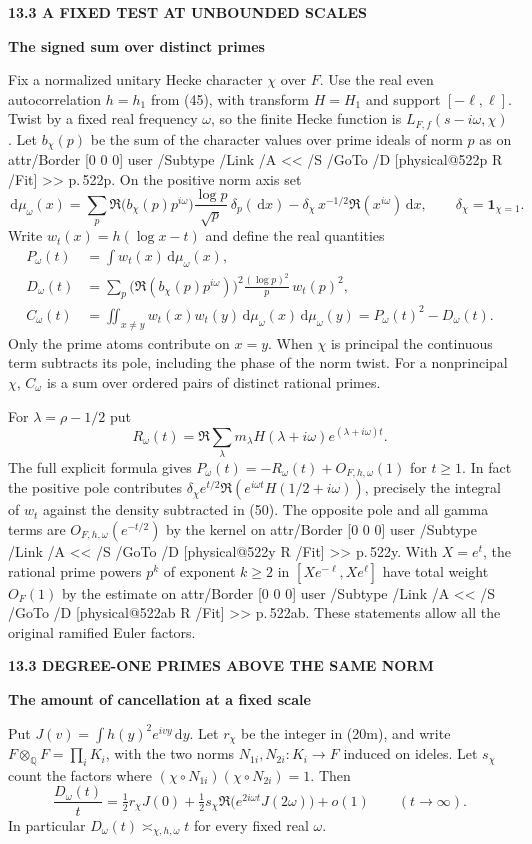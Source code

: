 \documentclass[11pt,letterpaper]{article}
\makeatletter
\newcommand{\rightmarktext}{}
\newcommand{\printfolio}{}
\newcommand{\leaf}[4]{\clearpage\gdef\printfolio{#1}\gdef\rightmarktext{#2}%
  {\small\sffamily\bfseries\color{ink}#3\par}\vspace{3pt}%
  {\LARGE\bfseries #4\par}\vspace{5pt}}
\newcommand{\Q}{\mathbb Q}
\newcommand{\dd}{\,\mathrm d}
\newcommand{\MusicPDFPageRef}[1]{\pdfpageref\csname physical@#1\endcsname\space\space 0 R}
\newcommand{\pagelink}[2]{\leavevmode\pdfstartlink attr{/Border [0 0 0]} user{%
  /Subtype /Link /A << /S /GoTo /D [\MusicPDFPageRef{#1} /Fit] >>}%
  {\color{ink}#2}\pdfendlink}
\newcommand{\pg}[1]{\pagelink{#1}{p.\,#1}}
\makeatother
\begin{document}
\leaf{522ad}{Distinct prime pairs}{13.3 \quad A FIXED TEST AT UNBOUNDED SCALES}{The signed sum over distinct primes}
Fix a normalized unitary Hecke character $\chi$ over $F$. Use the
real even autocorrelation $h=h_1$ from (45), with transform $H=H_1$
and support $[-\ell,\ell]$. Twist by a fixed real frequency $\omega$,
so the finite Hecke function is $L_{F,f}(s-i\omega,\chi)$.
Let $b_\chi(p)$ be the sum of the character values over prime ideals
of norm $p$ as on \pg{522p}. On the positive norm axis set
\[
 \dd\mu_\omega(x)=
 \sum_p\Re\!\big(b_\chi(p)p^{i\omega}\big)\frac{\log p}{\sqrt p}
             \,\delta_p(\dd x)
 -\delta_\chi\,x^{-1/2}\Re(x^{i\omega})\dd x ,
 \qquad \delta_\chi=\mathbf1_{\chi=1}.
\]
Write $w_t(x)=h(\log x-t)$ and define the real quantities
\begin{align*}
 P_\omega(t)&=\int w_t(x)\dd\mu_\omega(x),\\
 D_\omega(t)&=\sum_p\big(\Re(b_\chi(p)p^{i\omega})\big)^2
                      \frac{(\log p)^2}{p}\,w_t(p)^2,\\
 C_\omega(t)&=\iint_{x\ne y}w_t(x)w_t(y)\dd\mu_\omega(x)\dd\mu_\omega(y)
                   =P_\omega(t)^2-D_\omega(t).
 \tag{50}
\end{align*}
Only the prime atoms contribute on $x=y$. When $\chi$ is principal
the continuous term subtracts its pole, including the phase of the
norm twist. For a nonprincipal $\chi$, $C_\omega$ is a sum over
ordered pairs of distinct rational primes.

For $\lambda=\rho-1/2$ put
\[
 R_\omega(t)=\Re\sum_\lambda m_\lambda
           H(\lambda+i\omega)e^{(\lambda+i\omega)t}.
\]
The full explicit formula gives $P_\omega(t)=-R_\omega(t)+O_{F,h,\omega}(1)$
for $t\ge1$. In fact the positive pole contributes
$\delta_\chi e^{t/2}\Re(e^{i\omega t}H(1/2+i\omega))$, precisely
the integral of $w_t$ against the density subtracted in (50).
The opposite pole and all gamma terms are $O_{F,h,\omega}(e^{-t/2})$
by the kernel on \pg{522y}. With $X=e^t$, the rational prime powers
$p^k$ of exponent $k\ge2$ in $[Xe^{-\ell},Xe^\ell]$ have total weight
$O_F(1)$ by the estimate on \pg{522ab}. These statements allow all
the original ramified Euler factors.

\leaf{522ae}{The diagonal term}{13.3 \quad DEGREE-ONE PRIMES ABOVE THE SAME NORM}{The amount of cancellation at a fixed scale}
Put $J(v)=\int h(y)^2e^{ivy}\dd y$. Let $r_\chi$ be the integer
in (20m), and write $F\otimes_\Q F=\prod_i K_i$, with the two norms
$N_{1i},N_{2i}:K_i\to F$ induced on ideles. Let $s_\chi$ count the
factors where $(\chi\circ N_{1i})(\chi\circ N_{2i})=1$. Then
\[
 \frac{D_\omega(t)}{t}=
 \tfrac12 r_\chi J(0)+
 \tfrac12 s_\chi\Re\!\big(e^{2i\omega t}J(2\omega)\big)+o(1)
                    \qquad (t\to\infty).
 \tag{51}
\]
In particular $D_\omega(t)\asymp_{\chi,h,\omega}t$ for every fixed
real $\omega$.
\end{document}
